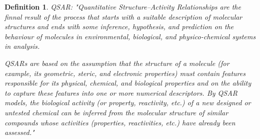 \documentclass[12pt,letterpaper]{article}
\newtheorem{definition}{Definition}
\begin{document}
\begin{multicols}{2}
\begin{definition}
QSAR: "Quantitative Structure–Activity Relationships are the finnal result of the
process that starts with a suitable description of molecular structures and ends with
some inference, hypothesis, and prediction on the behaviour of molecules in environmental, biological, and physico-chemical systems in analysis.\par
QSARs are based on the assumption that the structure of a molecule (for example,
its geometric, steric, and electronic properties) must contain features responsible for
its physical, chemical, and biological properties and on the ability to capture these
features into one or more numerical descriptors. By QSAR models, the biological
activity (or property, reactivity, etc.) of a new designed or untested chemical can be
inferred from the molecular structure of similar compounds whose activities
(properties, reactivities, etc.) have already been assessed."\cite{DescriptorsBookClassification}
\end{definition}
\end{multicols}
\newpage


\end{document}
